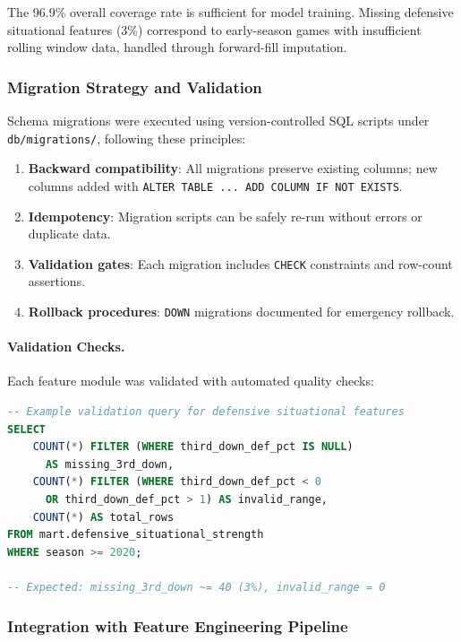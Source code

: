 The 96.9\% overall coverage rate is sufficient for model training. Missing defensive situational features (3\%) correspond to early-season games with insufficient rolling window data, handled through forward-fill imputation.

\subsubsection{Migration Strategy and Validation}

Schema migrations were executed using version-controlled SQL scripts under \texttt{db/migrations/}, following these principles:

\begin{enumerate}
  \item \textbf{Backward compatibility}: All migrations preserve existing columns; new columns added with \texttt{ALTER TABLE ... ADD COLUMN IF NOT EXISTS}.
  \item \textbf{Idempotency}: Migration scripts can be safely re-run without errors or duplicate data.
  \item \textbf{Validation gates}: Each migration includes \texttt{CHECK} constraints and row-count assertions.
  \item \textbf{Rollback procedures}: \texttt{DOWN} migrations documented for emergency rollback.
\end{enumerate}

\paragraph{Validation Checks.}
Each feature module was validated with automated quality checks:
\begin{lstlisting}[language=SQL,basicstyle=\ttfamily\footnotesize]
-- Example validation query for defensive situational features
SELECT
    COUNT(*) FILTER (WHERE third_down_def_pct IS NULL)
      AS missing_3rd_down,
    COUNT(*) FILTER (WHERE third_down_def_pct < 0
      OR third_down_def_pct > 1) AS invalid_range,
    COUNT(*) AS total_rows
FROM mart.defensive_situational_strength
WHERE season >= 2020;

-- Expected: missing_3rd_down ~= 40 (3%), invalid_range = 0
\end{lstlisting}

\subsubsection{Integration with Feature Engineering Pipeline}

